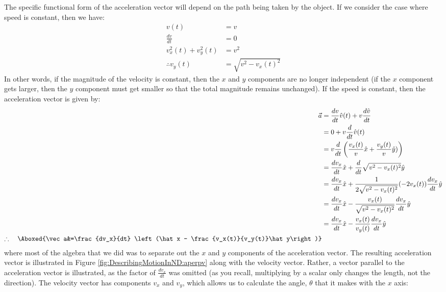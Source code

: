 The specific functional form of the acceleration vector will depend on the path being taken by the object. If we consider the case where speed is constant, then we have:
\begin{align*}
v(t) &= v \\
\frac{dv}{dt}&=0\\
v_x^2(t)+v_y^2(t) &=v^2 \\
\therefore v_y(t)&=\sqrt{v^2-v_x(t)^2}
\end{align*}
In other words, if the magnitude of the velocity is constant, then the $x$ and $y$ components are no longer independent (if the $x$ component gets larger, then the $y$ component must get smaller so that the total magnitude remains unchanged). If the speed is constant, then the acceleration vector is given by:
\begin{align}
\label{eqn:DescribingMotionInND:vecaconstv}
\vec a&=\frac{dv}{dt}\hat v(t)+v\frac{d\hat v}{dt}\nonumber\\
&=0 + v\frac{d}{dt}\hat v(t)\nonumber\\
&=v\frac{d}{dt}\left(\frac{v_x(t)}{v}\hat x+\frac{v_y(t)}{v}\hat y   )\right)\nonumber\\
&=\frac{dv_x}{dt}\hat x + \frac{d}{dt}\sqrt{v^2-v_x(t)^2}\hat y\nonumber\\
&=\frac{dv_x}{dt}\hat x + \frac{1}{2\sqrt{v^2-v_x(t)^2}}(-2v_x(t))\frac{dv_x}{dt}\hat y\nonumber\\
&=\frac{dv_x}{dt}\hat x - \frac{v_x(t)}{\sqrt{v^2-v_x(t)^2}}\frac{dv_x}{dt}\hat y\nonumber\\
&=\frac{dv_x}{dt}\hat x - \frac{v_x(t)}{v_y(t)}\frac{dv_x}{dt}\hat y\nonumber\\
\therefore\quad\Aboxed{\vec a&=\frac{dv_x}{dt} \left(\hat x - \frac{v_x(t)}{v_y(t)}\hat y\right)}
\end{align}
where most of the algebra that we did was to separate out the $x$ and $y$ components of the acceleration vector. The resulting acceleration vector is illustrated in Figure \ref{fig:DescribingMotionInND:aperpv} along with the velocity vector. Rather, a vector parallel to the acceleration vector is illustrated, as the factor of $\frac{dv_x}{dt}$ was omitted (as you recall, multiplying by a scalar only changes the length, not the direction). The velocity vector has components $v_x$ and $v_y$, which allows us to calculate the angle, $\theta$ that it makes with the $x$ axis:
